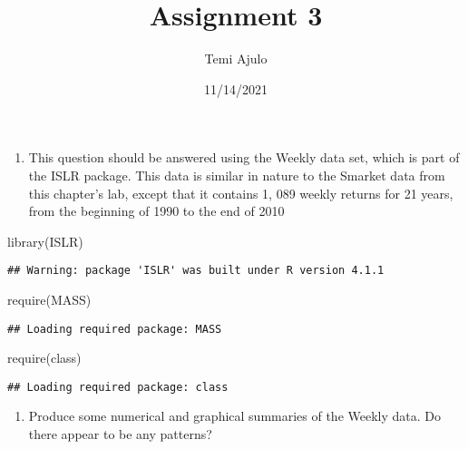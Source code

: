 \documentclass[
]{article}
\title{Assignment 3}
\author{Temi Ajulo}
\date{11/14/2021}
\newenvironment{Shaded}{\begin{snugshade}}{\end{snugshade}}
\newcommand{\FunctionTok}[1]{\textcolor[rgb]{0.00,0.00,0.00}{#1}}
\newcommand{\NormalTok}[1]{#1}
\providecommand{\tightlist}{%
  \setlength{\itemsep}{0pt}\setlength{\parskip}{0pt}}
\begin{document}
\maketitle

\begin{enumerate}
\def\labelenumi{\arabic{enumi}.}
\setcounter{enumi}{9}
\tightlist
\item
  This question should be answered using the Weekly data set, which is
  part of the ISLR package. This data is similar in nature to the
  Smarket data from this chapter's lab, except that it contains 1, 089
  weekly returns for 21 years, from the beginning of 1990 to the end of
  2010
\end{enumerate}

\begin{Shaded}
\begin{Highlighting}[]
\FunctionTok{library}\NormalTok{(ISLR)}
\end{Highlighting}
\end{Shaded}

\begin{verbatim}
## Warning: package 'ISLR' was built under R version 4.1.1
\end{verbatim}

\begin{Shaded}
\begin{Highlighting}[]
\FunctionTok{require}\NormalTok{(MASS)}
\end{Highlighting}
\end{Shaded}

\begin{verbatim}
## Loading required package: MASS
\end{verbatim}

\begin{Shaded}
\begin{Highlighting}[]
\FunctionTok{require}\NormalTok{(class)}
\end{Highlighting}
\end{Shaded}

\begin{verbatim}
## Loading required package: class
\end{verbatim}

\begin{enumerate}
\def\labelenumi{(\alph{enumi})}
\tightlist
\item
  Produce some numerical and graphical summaries of the Weekly data. Do
  there appear to be any patterns?
\end{enumerate}
\end{document}
